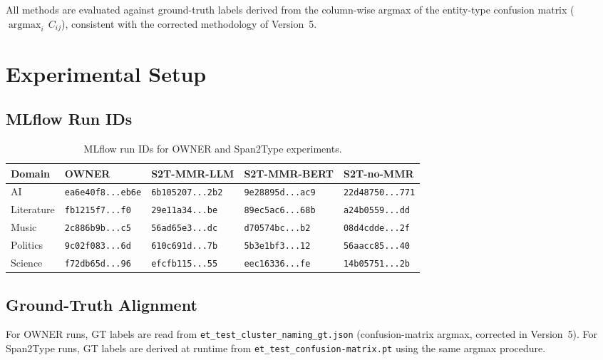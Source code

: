 \documentclass[11pt,a4paper]{article}
\begin{document}
\noindent
All methods are evaluated against ground-truth labels derived from the
column-wise argmax of the entity-type confusion matrix
($\operatorname{argmax}_i\,C_{ij}$), consistent with the corrected
methodology of Version~5.

\section{Experimental Setup}

\subsection{MLflow Run IDs}

\begin{table}[h]
\centering
\caption{MLflow run IDs for OWNER and Span2Type experiments.}
\label{tab:runs}
\setlength{\tabcolsep}{4pt}
\small
\begin{tabular}{l l l l l}
\toprule
\textbf{Domain}
  & \textbf{OWNER}
  & \textbf{S2T-MMR-LLM}
  & \textbf{S2T-MMR-BERT}
  & \textbf{S2T-no-MMR} \\
\midrule
AI
  & \texttt{ea6e40f8...eb6e}
  & \texttt{6b105207...2b2}
  & \texttt{9e28895d...ac9}
  & \texttt{22d48750...771} \\
Literature
  & \texttt{fb1215f7...f0}
  & \texttt{29e11a34...be}
  & \texttt{89ec5ac6...68b}
  & \texttt{a24b0559...dd} \\
Music
  & \texttt{2c886b9b...c5}
  & \texttt{56ad65e3...dc}
  & \texttt{d70574bc...b2}
  & \texttt{08d4cdde...2f} \\
Politics
  & \texttt{9c02f083...6d}
  & \texttt{610c691d...7b}
  & \texttt{5b3e1bf3...12}
  & \texttt{56aacc85...40} \\
Science
  & \texttt{f72db65d...96}
  & \texttt{efcfb115...55}
  & \texttt{eec16336...fe}
  & \texttt{14b05751...2b} \\
\bottomrule
\end{tabular}
\end{table}

\subsection{Ground-Truth Alignment}

For OWNER runs, GT labels are read from \texttt{et\_test\_cluster\_naming\_gt.json}
(confusion-matrix argmax, corrected in Version~5).
For Span2Type runs, GT labels are derived at runtime from
\texttt{et\_test\_confusion-matrix.pt} using the same argmax procedure.
\end{document}
